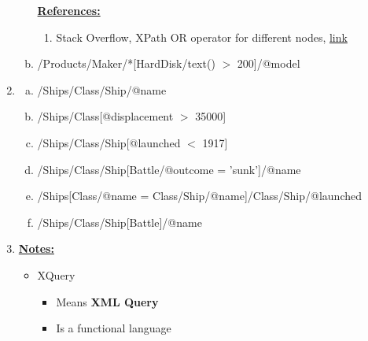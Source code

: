 \documentclass[12pt]{article}
\begin{document}
\begin{enumerate}[1.]
\begin{enumerate}[a)]
        \bigskip

        \underline{\textbf{References:}}

        \bigskip

        \begin{enumerate}[1)]
            \item Stack Overflow, XPath OR operator for different nodes, \href{https://stackoverflow.com/questions/5350666/xpath-or-operator-for-different-nodes}{link}
        \end{enumerate}

        \item /Products/Maker/*[HardDisk/text() $>$ 200]/@model
    \end{enumerate}

    \item

    \begin{enumerate}[a)]
        \item /Ships/Class/Ship/@name
        \item /Ships/Class[@displacement $>$ 35000]
        \item /Ships/Class/Ship[@launched $<$ 1917]
        \item /Ships/Class/Ship[Battle/@outcome = 'sunk']/@name
        \item /Ships[Class/@name = Class/Ship/@name]/Class/Ship/@launched
        \item /Ships/Class/Ship[Battle]/@name
    \end{enumerate}

    \item

    \bigskip

    \underline{\textbf{Notes:}}

    \bigskip

    \begin{itemize}
        \item XQuery
        \begin{itemize}
            \item Means \textbf{XML Query}
            \item Is a functional language
        \end{itemize}
    \end{itemize}
\end{enumerate}
\end{document}
